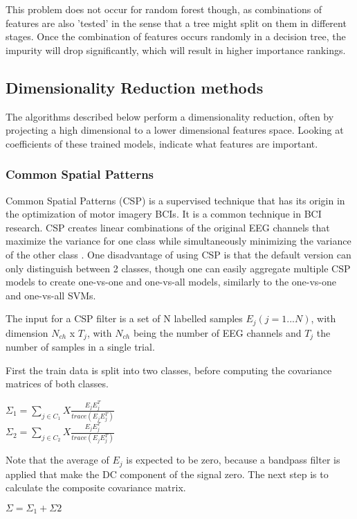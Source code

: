\npar

This problem does not occur for random forest though, as combinations of features are also 'tested' in the sense that a tree might split on them in different stages. Once the combination of features occurs randomly in a decision tree, the impurity will drop significantly, which will result in higher importance rankings.

\subsection{Dimensionality Reduction methods}
The algorithms described below perform a dimensionality reduction, often by projecting a high dimensional to a lower dimensional features space. Looking at coefficients of these trained models, indicate what features are important.

\subsubsection{Common Spatial Patterns}
Common Spatial Patterns (CSP) is a supervised technique that has its origin in the optimization of motor imagery BCIs\citep{CSPSeba}. It is a common technique in BCI research\cite{ErrorPotentials,svmldacomp,currTrends}. CSP creates linear combinations of the original EEG channels that maximize the variance for one class while simultaneously minimizing the variance of the other class \cite{ErrorPotentials}. One disadvantage of using CSP is that the default version can only distinguish between 2 classes, though one can easily aggregate multiple CSP models to create one-vs-one and one-vs-all models, similarly to the one-vs-one and one-vs-all SVMs.

\npar

The input for a CSP filter is a set of N labelled samples $E_j (j=1...N)$, with dimension $N_{ch}$ x $T_j$, with $N_{ch}$ being the number of EEG channels and $T_j$ the number of samples in a single trial\citep{CSPSeba}.

\npar

First the train data is split into two classes, before computing the covariance matrices of both classes.
\begin{center}
$\Sigma_1 = {\displaystyle \sum_{j \in C_1}} X\frac{E_jE_j^T}{trace(E_jE_j^T)}$ \\
$\Sigma_2 = {\displaystyle \sum_{j \in C_2}} X\frac{E_jE_j^T}{trace(E_jE_j^T)}$ \\
\end{center}
Note that the average of $E_j$ is expected to be zero, because a bandpass filter is applied that make the DC component of the signal zero. The next step is to calculate the composite covariance matrix.
\begin{center}
$\Sigma = \Sigma_1 + \Sigma2$
\end{center}

